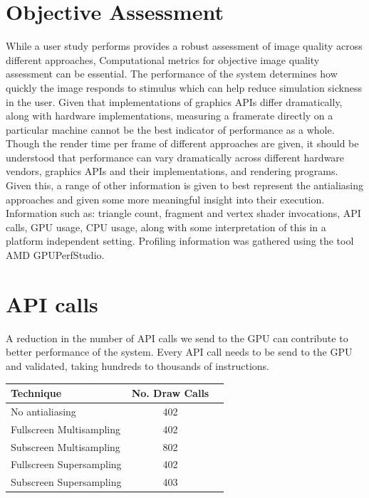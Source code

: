 \documentclass[12pt,a4paper,twoside,openright]{report}
\begin{document}
\section{Objective Assessment}

While a user study performs provides a robust assessment of image quality across different approaches, Computational metrics for objective image quality assessment can be essential. The performance of the system determines how quickly the image responds to stimulus which can help reduce simulation sickness in the user. Given that implementations of graphics APIs differ dramatically, along with hardware implementations, measuring a framerate directly on a particular machine cannot be the best indicator of performance as a whole. Though the render time per frame of different approaches are given, it should be understood that performance can vary dramatically across different hardware vendors, graphics APIs and their implementations, and rendering programs. Given this, a range of other information is given to best represent the antialiasing approaches and given some more meaningful insight into their execution. Information such as: triangle count, fragment and vertex shader invocations, API calls, GPU usage, CPU usage, along with some interpretation of this in a platform independent setting. Profiling information was gathered using the tool AMD GPUPerfStudio.

\section{API calls}

A reduction in the number of API calls we send to the GPU can contribute to better performance of the system. Every API call needs to be send to the GPU and validated, taking hundreds to thousands of instructions.

\begin{center}
\begin{tabular}{l|c|r}
Technique   & No. Draw Calls \\ 
\hline
No antialiasing      & 402 \\
Fullscreen Multisampling     & 402 \\
Subscreen Multisampling    &  802  \\
Fullscreen Supersampling      &  402   \\
Subscreen Supersampling    &  403  \\
\end{tabular}
\end{center}
\end{document}
